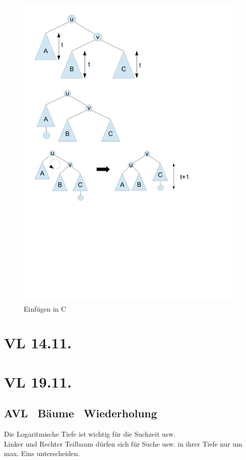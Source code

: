 \documentclass[a4paper,twoside,10pt]{report}
\begin{document}
\begin{figure}[H]\center
\includegraphics[trim= 1cm 10cm 4cm 14cm,clip,width=\columnwidth]{figures/avlins.pdf}
\caption{Einfügen in C}
\end{figure}
\chapter{VL 14.11.}

\chapter{VL 19.11.}
\section{AVL \, Bäume \, Wiederholung}

Die Logaritmische Tiefe ist wichtig für die Suchzeit usw.\\
Linker und Rechter Teilbaum dürfen sich für Suche usw. in ihrer Tiefe nur um max. Eins unterscheiden.
\end{document}
